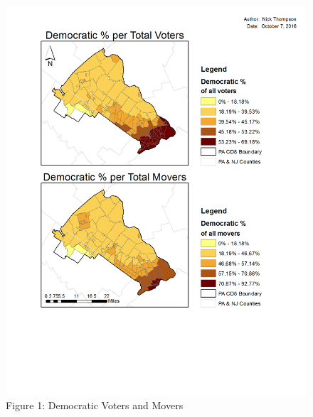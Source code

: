 \documentclass[]{article}
\begin{document}
\begin{figure}[htbp]
\centering
\includegraphics{question_1-2.png}
\caption{Figure 1: Democratic Voters and Movers}
\end{figure}
\end{document}
